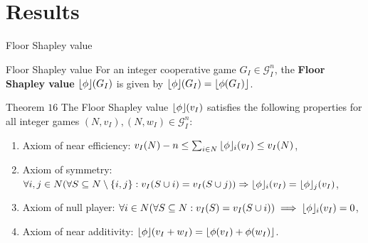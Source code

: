 \documentclass{beamer}
\newcommand{\floor}[1]{\left\lfloor #1 \right\rfloor}
\newcommand{\floorphi}{\ensuremath{\floor{\phi}\hspace{-0.5ex}}}
\begin{document}



\section{Results}


\begin{frame}{Floor Shapley value}
    \pause

    \begin{block}{Floor Shapley value}
        \pause
        For an integer cooperative game $G_I \in \mathcal{G}_I^n$, the \textbf{Floor Shapley value} $\floorphi(G_I)$ is given by $\floorphi(G_I) = \floor{\phi(G_I)}$.
    \end{block}

    \pause

    \begin{block}{Theorem $16$}
        \pause
        The Floor Shapley value $\floorphi(v_I)$ satisfies the following properties for all integer games $(N,v_I),(N,w_I) \in \mathcal{G}_I^n$:
        \begin{enumerate}
            \pause
            \item Axiom of near efficiency: $v_I(N) - n \leq \sum_{i \in N} \floorphi_i(v_I) \leq v_I(N)$,
            \pause
            \item Axiom of symmetry: $\forall i,j \in N (\forall S \subseteq N \setminus \{i,j\}: v_I(S \cup i) = v_I(S \cup j)) \Rightarrow \floorphi_{i}(v_I) = \floorphi_{j}(v_I)$,
            \pause
            \item Axiom of null player: $\forall i \in N(\forall S \subseteq N: v_I(S)=v_I(S \cup i)) \implies \floorphi_{i}(v_I) = 0$,
            \pause
            \item Axiom of near additivity: $\floorphi(v_I+w_I) = \floor{\phi(v_I) + \phi(w_I)}$.
        \end{enumerate}
    \end{block}

\end{frame}


\end{document}
